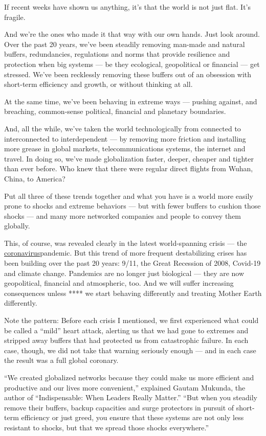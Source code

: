 If recent weeks have shown us anything, it's that the world is not just
flat. It's fragile.

And we're the ones who made it that way with our own hands. Just look
around. Over the past 20 years, we've been steadily removing man-made
and natural buffers, redundancies, regulations and norms that provide
resilience and protection when big systems --- be they ecological,
geopolitical or financial --- get stressed. We've been recklessly
removing these buffers out of an obsession with short-term efficiency
and growth, or without thinking at all.

At the same time, we've been behaving in extreme ways --- pushing
against, and breaching, common-sense political, financial and planetary
boundaries.

And, all the while, we've taken the world technologically from connected
to interconnected to interdependent --- by removing more friction and
installing more grease in global markets, telecommunications systems,
the internet and travel. In doing so, we've made globalization faster,
deeper, cheaper and tighter than ever before. Who knew that there were
regular direct flights from Wuhan, China, to America?

Put all three of these trends together and what you have is a world more
easily prone to shocks and extreme behaviors --- but with fewer buffers
to cushion those shocks --- and many more networked companies and people
to convey them globally.

This, of course, was revealed clearly in the latest world-spanning
crisis --- the
\href{https://www.nytimes3xbfgragh.onion/2020/06/01/health/coronavirus-mysteries.html}{coronavirus}pandemic.
But this trend of more frequent destabilizing crises has been building
over the past 20 years: 9/11, the Great Recession of 2008, Covid-19 and
climate change. Pandemics are no longer just biological --- they are now
geopolitical, financial and atmospheric, too. And we will suffer
increasing consequences unless **** we start behaving differently and
treating Mother Earth differently.

Note the pattern: Before each crisis I mentioned, we first experienced
what could be called a ``mild'' heart attack, alerting us that we had
gone to extremes and stripped away buffers that had protected us from
catastrophic failure. In each case, though, we did not take that warning
seriously enough --- and in each case the result was a full global
coronary.

``We created globalized networks because they could make us more
efficient and productive and our lives more convenient,'' explained
Gautam Mukunda, the author of ``Indispensable: When Leaders Really
Matter.'' ``But when you steadily remove their buffers, backup
capacities and surge protectors in pursuit of short-term efficiency or
just greed, you ensure that these systems are not only less resistant to
shocks, but that we spread those shocks everywhere.''

